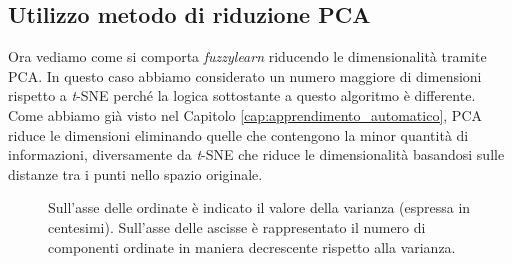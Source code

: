 \documentclass[12pt,italian]{report}
\begin{document}
\subsection{Utilizzo metodo di riduzione PCA}
Ora vediamo come si comporta \emph{fuzzylearn} riducendo le dimensionalità tramite PCA. In questo caso abbiamo considerato un numero maggiore di dimensioni rispetto a \emph{t}-SNE perché la logica sottostante a questo algoritmo è differente. Come abbiamo già visto nel Capitolo \ref{cap:apprendimento_automatico}, PCA riduce le dimensioni eliminando quelle che contengono la minor quantità di informazioni, diversamente da \emph{t}-SNE che riduce le dimensionalità basandosi sulle distanze tra i punti nello spazio originale. 
\begin{figure}
	\centering
	\caption{ Sull'asse delle ordinate è indicato il valore della varianza (espressa in centesimi). Sull'asse delle ascisse è rappresentato il numero di componenti ordinate in maniera decrescente rispetto alla varianza.}
	\label{fig:var_ratio_pca}
\end{figure}
\end{document}
